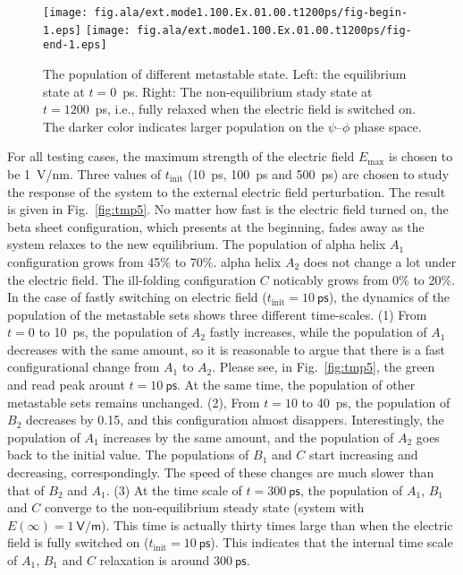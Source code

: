 \documentclass[a4paper,preprint,onecolumn]{revtex4-1}
\begin{document}
\begin{figure}
  \centering
  \texttt{[image: fig.ala/ext.mode1.100.Ex.01.00.t1200ps/fig-begin-1.eps]}
  \texttt{[image: fig.ala/ext.mode1.100.Ex.01.00.t1200ps/fig-end-1.eps]}
  \caption{The population of different metastable state. Left: the equilibrium state at $t=0$~\textsf{ps}. Right: The non-equilibrium stady state at $t=1200$~\textsf{ps}, i.e., fully relaxed when the electric field is switched on. The darker color indicates larger population on the $\psi$--$\phi$ phase space.}
  \label{fig:tmp4}
\end{figure}


For all testing cases, the maximum strength of the electric field
$E_{\textrm{max}}$ is chosen to be 1~\textsf{V/nm}.  Three values of
$t_{\textrm{init}}$ (10~\textsf{ps}, 100~\textsf{ps} and
500~\textsf{ps}) are chosen to study the response of the system to the
external electric field perturbation. The result is given in
Fig.~\ref{fig:tmp5}.  No matter how fast is the electric field turned
on, the beta sheet configuration, which presents at the beginning,
fades away as the system relaxes to the new equilibrium. The
population of alpha helix $A_1$ configuration grows from 45\% to 70\%.
alpha helix $A_2$  does not change a lot under the electric field.
The ill-folding configuration $C$ noticably grows from 0\% to 20\%.
\\

In the case of fastly switching on electric field
($t_{\textrm{init}}=10~\textsf{ps}$), the dynamics of the population
of the metastable sets shows three different time-scales. (1) From
$t=0$ to 10~\textsf{ps}, the population of $A_2$ fastly increases,
while the population of $A_1$ decreases with the same amount, so it is
reasonable to argue that there is a fast configurational change from
$A_1$ to $A_2$. Please see, in Fig.~\ref{fig:tmp5}, the green and read
peak arount $t = 10~\textsf{ps}$. At the same time, the population of
other metastable sets remains unchanged.  (2), From $t=10$ to
40~\textsf{ps}, the population of $B_2$ decreases by 0.15, and this
configuration almost disappers. Interestingly, the population of $A_1$
increases by the same amount, and the population of $A_2$ goes back to
the initial value. The populations of $B_1$ and $C$ start increasing
and decreasing, correspondingly. The speed of these changes are much
slower than that of $B_2$ and $A_1$.  (3) At the time scale of $t =
300~\textsf{ps}$, the population of $A_1$, $B_1$ and $C$ converge to
the non-equilibrium steady state (system with $E(\infty) = 1~\textsf{V/m}$).
This time is actually thirty times large than when the electric field
is fully switched on ($t_{\textrm{init}} = 10~\textsf{ps}$). This 
indicates that the internal time scale of $A_1$, $B_1$ and $C$
relaxation is around $300~\textsf{ps}$.\\
\end{document}
